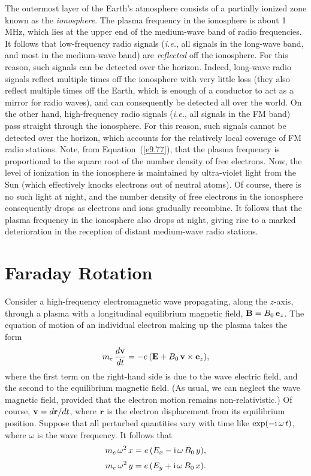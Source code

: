 The outermost layer of the Earth's atmosphere consists of a partially ionized
zone known as the {\em ionosphere}. The plasma frequency in the
ionosphere is about 1\,MHz, which lies at the upper end of the
medium-wave band of radio frequencies. It follows that low-frequency radio signals ({\em i.e.}, all signals in the long-wave band,
and most in the medium-wave band) are {\em reflected}\/ off the ionosphere. 
For this reason, such signals can be detected over the horizon. Indeed,
long-wave radio signals reflect multiple times off the ionosphere with very little loss (they also
reflect multiple times off the Earth, which is enough of a conductor
to act as a mirror for radio waves), and can consequently be detected all over the world.
On the other hand, high-frequency radio signals ({\em i.e.}, all
signals in the FM band) pass straight through the ionosphere. For this
reason, such signals cannot be detected over the horizon, which accounts
for the relatively local coverage of FM radio stations. Note, from 
Equation~(\ref{e9.77}), that the plasma frequency is proportional to the
square root of the number density of free electrons. Now, the
level of ionization in the ionosphere is maintained by ultra-violet light from the Sun (which effectively knocks electrons out of neutral atoms). Of course, there
is no such light at night, and the number density of free electrons in the
ionosphere consequently drops as electrons and ions gradually recombine.
It follows that the plasma frequency in the ionosphere also drops at night, giving
rise to a marked deterioration in the reception of distant medium-wave radio stations.

\section{Faraday Rotation}
Consider a high-frequency electromagnetic wave propagating, along the $z$-axis,  through
a plasma with a longitudinal equilibrium magnetic field,
${\bf B} = B_0\,{\bf e}_z$.
The equation of motion of an individual electron making up the plasma takes the
form
\begin{equation}
m_e\,\frac{d{\bf v}}{dt} = -e\,({\bf E} + B_0\,{\bf v}\times{\bf e}_z),
\end{equation}
where the first term on the right-hand side is due to the wave electric field,
and the second  to the equilibrium magnetic field.
(As usual, we can neglect the wave magnetic field, provided that the
electron motion remains non-relativistic.)
Of course, ${\bf v} = d{\bf r}/dt$, where ${\bf r}$ is the electron
displacement from its equilibrium position. Suppose that all perturbed quantities vary with time
like $\exp(-{\rm i}\,\omega\,t)$, where $\omega$ is the wave frequency.
It follows that
\begin{eqnarray}\label{e9.93}
m_e\,\omega^2\,x = e\,(E_x - {\rm i}\,\omega\,B_0\,y),\\[0.5ex]
m_e\,\omega^2\,y = e\,(E_y+{\rm i}\,\omega\,B_0\,x).\label{e9.94}
\end{eqnarray}

